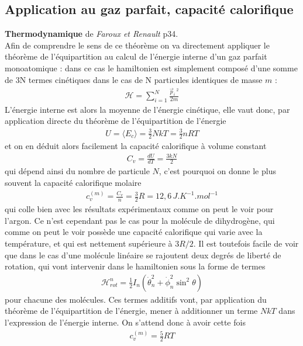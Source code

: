 \documentclass[12pt,prb,aps,epsf]{article}
\begin{document}
\subsection{Application au gaz parfait, capacité calorifique}	
\textbf{Thermodynamique} de \textit{Faroux et Renault} p34.\\

Afin de comprendre le sens de ce théorème on va directement appliquer le théorème de l'équipartition au calcul de l'énergie interne d'un gaz parfait monoatomique : dans ce cas le hamiltonien est simplement composé d'une somme de 3N termes cinétiques dans le cas de N particules identiques de masse $m$ :
\begin{eqnarray}
\mathcal{H} = \sum_{i=1}^{N} \frac{\vec{p}_i\,^2}{2m}
\end{eqnarray} 
L'énergie interne est alors la moyenne de l'énergie cinétique, elle vaut donc, par application directe du théorème de l'équipartition de l'énergie
\begin{eqnarray}
U = \langle E_c\rangle = \frac{3}{2}NkT = \frac{3}{2} n R T
\end{eqnarray}
et on en déduit alors facilement la capacité calorifique à volume constant
\begin{eqnarray}
C_v = \frac{dU}{dT} = \frac{3kN}{2}
\end{eqnarray}
qui dépend ainsi du nombre de particule $N$, c'est pourquoi on donne le plus souvent la capacité calorifique molaire 
\begin{eqnarray}
c^{(m)}_v = \frac{C_v}{n} = \frac{3}{2} R = 12,6\,J.K^{-1}.mol^{-1}
\end{eqnarray}
qui colle bien avec les résultats expérimentaux comme on peut le voir pour l'argon. Ce n'est cependant pas le cas pour la molécule de dihydrogène, qui comme on peut le voir possède une capacité calorifique qui varie avec la température, et qui est nettement supérieure à $3R/2$. Il est toutefois facile de voir que dans le cas d'une molécule linéaire se rajoutent deux degrés de liberté de rotation, qui vont intervenir dans le hamiltonien sous la forme de termes 
\begin{eqnarray}
\mathcal{H}_{rot}^n  = \frac{1}{2}I_n  \left(\dot{\theta}_n^2 +  \dot{\phi}_n^2\sin^2\theta\right)
\end{eqnarray}
pour chacune des molécules. Ces termes additifs vont, par application du théorème de l'équipartition de l'énergie, mener à additionner un terme $NkT$ dans l'expression de l'énergie interne. On s'attend donc à avoir cette fois
\begin{eqnarray}
c_v^{(m)} = \frac{5}{2}RT
\end{eqnarray}
\end{document}
